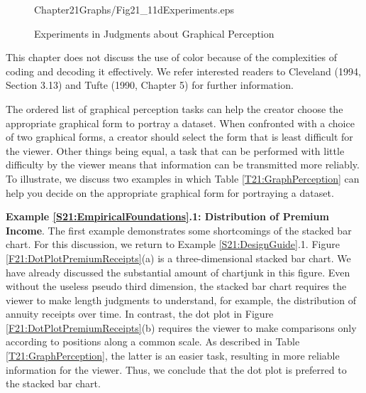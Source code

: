 \begin{figure}[htp]
\begin{center}
{   {Chapter21Graphs/Fig21_11dExperiments.eps}}  \hfill
    \caption{\label{F21:11aExperiments} \small Experiments in Judgments about Graphical Perception}
  \end{center}
\end{figure}



This chapter does not discuss the use of color because of the
complexities of coding and decoding it effectively. We refer
interested readers to Cleveland (1994, Section 3.13) and Tufte
(1990, Chapter 5) for further information.

The ordered list of graphical perception tasks can help the creator
choose the appropriate graphical form to portray a dataset. When
confronted with a choice of two graphical forms, a creator should
select the form that is least difficult for the viewer. Other things
being equal, a task that can be performed with little difficulty by
the viewer means that information can be transmitted more reliably.
To illustrate, we discuss two examples in which Table
\ref{T21:GraphPerception} can help you decide on the appropriate
graphical form for portraying a dataset.

\linejed

\textbf{Example \ref{S21:EmpiricalFoundations}.1: Distribution of
Premium Income}. The first example demonstrates some shortcomings of
the stacked bar chart. For this discussion, we return to Example
\ref{S21:DesignGuide}.1. Figure \ref{F21:DotPlotPremiumReceipts}(a)
is a three-dimensional stacked bar chart. We have already discussed
the substantial amount of chartjunk in this figure. Even without the
useless pseudo third dimension, the stacked bar chart requires the
viewer to make length judgments to understand, for example, the
distribution of annuity receipts over time. In contrast, the dot
plot in Figure \ref{F21:DotPlotPremiumReceipts}(b) requires the
viewer to make comparisons only according to positions along a
common scale. As described in Table \ref{T21:GraphPerception}, the
latter is an easier task, resulting in more reliable information for
the viewer. Thus, we conclude that the dot plot is preferred to the
stacked bar chart.

